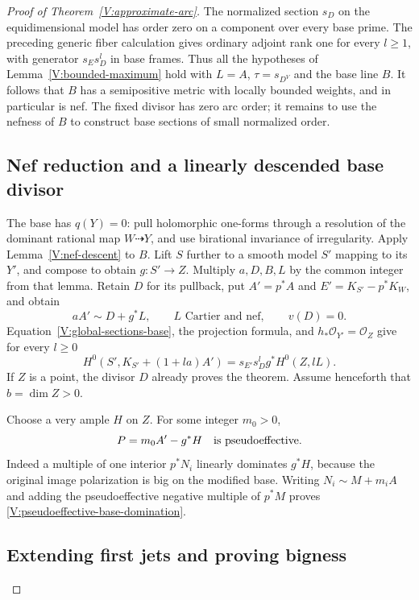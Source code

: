 \begin{proof}[Proof of Theorem~\ref{V:approximate-arc}]
The normalized section $s_D$ on the equidimensional model has order
zero on a component over every base prime.  The preceding generic
fiber calculation gives ordinary adjoint rank one for every
$l\ge1$, with generator $s_Es_D^l$ in base frames.  Thus all the
hypotheses of Lemma~\ref{V:bounded-maximum} hold with $L=A$,
$\tau=s_{D^V}$ and the base line $B$.  It follows that $B$ has a
semipositive metric with locally bounded weights, and in particular
is nef.  The fixed divisor has zero arc order; it remains to use the
nefness of $B$ to construct base sections of small normalized order.

\subsection*{Nef reduction and a linearly descended base divisor}

The base has $q(Y)=0$: pull holomorphic one-forms through a resolution
of the dominant rational map $W\dashrightarrow Y$, and use birational
invariance of irregularity.  Apply Lemma~\ref{V:nef-descent} to $B$.
Lift $S$ further to a smooth model $S'$ mapping to its $Y'$, and
compose to obtain $g:S'\to Z$.  Multiply $a,D,B,L$ by the common
integer from that lemma.  Retain $D$ for its pullback, put
$A'=p^*A$ and $E'=K_{S'}-p^*K_W$, and obtain
\[
 aA'\sim D+g^*L,
 \qquad L\text{ Cartier and nef},\qquad v(D)=0.
\]
Equation~\eqref{V:global-sections-base}, the projection formula,
and $h_*\mathcal O_{Y'}=\mathcal O_Z$ give for every $l\ge0$
\begin{equation}\label{V:adjoint-sections-base}
 H^0(S',K_{S'}+(1+la)A')
   =s_{E'}s_D^l g^*H^0(Z,lL).
\end{equation}
If $Z$ is a point, the divisor $D$ already proves the theorem.
Assume henceforth that $b=\dim Z>0$.

Choose a very ample $H$ on $Z$.  For some integer $m_0>0$,
\begin{equation}\label{V:pseudoeffective-base-domination}
 P=m_0A'-g^*H\quad\hbox{is pseudoeffective}.
\end{equation}
Indeed a multiple of one interior $p^*N_i$ linearly dominates $g^*H$,
because the original image polarization is big on the modified base.
Writing $N_i\sim M+m_iA$ and adding the pseudoeffective negative
multiple of $p^*M$ proves \eqref{V:pseudoeffective-base-domination}.

\subsection*{Extending first jets and proving bigness}


\end{proof}
